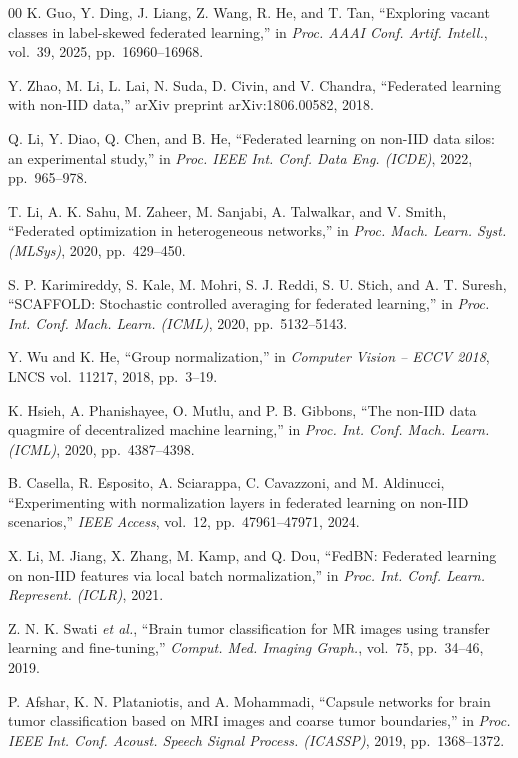 \documentclass[journal]{IEEEtran}
\begin{document}
\begin{thebibliography}{00}
K. Guo, Y. Ding, J. Liang, Z. Wang, R. He, and T. Tan, ``Exploring vacant
classes in label-skewed federated learning,'' in \emph{Proc. AAAI Conf. Artif.
Intell.}, vol.~39, 2025, pp.~16960--16968.

Y. Zhao, M. Li, L. Lai, N. Suda, D. Civin, and V. Chandra, ``Federated learning
with non-IID data,'' arXiv preprint arXiv:1806.00582, 2018.

Q. Li, Y. Diao, Q. Chen, and B. He, ``Federated learning on non-IID data silos:
an experimental study,'' in \emph{Proc. IEEE Int. Conf. Data Eng. (ICDE)}, 2022,
pp.~965--978.

T. Li, A. K. Sahu, M. Zaheer, M. Sanjabi, A. Talwalkar, and V. Smith,
``Federated optimization in heterogeneous networks,'' in \emph{Proc. Mach.
Learn. Syst. (MLSys)}, 2020, pp.~429--450.

S. P. Karimireddy, S. Kale, M. Mohri, S. J. Reddi, S. U. Stich, and A. T. Suresh,
``SCAFFOLD: Stochastic controlled averaging for federated learning,'' in
\emph{Proc. Int. Conf. Mach. Learn. (ICML)}, 2020, pp.~5132--5143.

Y. Wu and K. He, ``Group normalization,'' in \emph{Computer Vision -- ECCV
2018}, LNCS vol.~11217, 2018, pp.~3--19.

K. Hsieh, A. Phanishayee, O. Mutlu, and P. B. Gibbons, ``The non-IID data
quagmire of decentralized machine learning,'' in \emph{Proc. Int. Conf. Mach.
Learn. (ICML)}, 2020, pp.~4387--4398.

B. Casella, R. Esposito, A. Sciarappa, C. Cavazzoni, and M. Aldinucci,
``Experimenting with normalization layers in federated learning on non-IID
scenarios,'' \emph{IEEE Access}, vol.~12, pp.~47961--47971, 2024.

X. Li, M. Jiang, X. Zhang, M. Kamp, and Q. Dou, ``FedBN: Federated learning on
non-IID features via local batch normalization,'' in \emph{Proc. Int. Conf.
Learn. Represent. (ICLR)}, 2021.

Z. N. K. Swati \emph{et al.}, ``Brain tumor classification for MR images using
transfer learning and fine-tuning,'' \emph{Comput. Med. Imaging Graph.},
vol.~75, pp.~34--46, 2019.

P. Afshar, K. N. Plataniotis, and A. Mohammadi, ``Capsule networks for brain
tumor classification based on MRI images and coarse tumor boundaries,'' in
\emph{Proc. IEEE Int. Conf. Acoust. Speech Signal Process. (ICASSP)}, 2019,
pp.~1368--1372.


\end{thebibliography}
\end{document}
